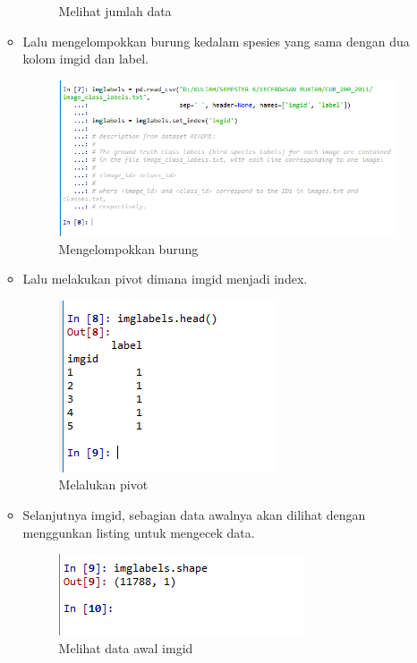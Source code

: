 \begin{enumerate}
\begin{itemize}
\begin{figure}[ht]
			\caption{Melihat jumlah data}
			\label{contoh}
			\end{figure}
		\item Lalu mengelompokkan burung kedalam spesies yang sama dengan dua kolom imgid dan label.
			\begin{figure}[ht]
			\centering
			\includegraphics[scale=0.5]{figures/AIP/ai13.PNG}
			\caption{Mengelompokkan burung}
			\label{contoh}
			\end{figure}
		\item Lalu melakukan pivot dimana imgid menjadi index.
			\begin{figure}[ht]
			\centering
			\includegraphics[scale=0.5]{figures/AIP/ai14.PNG}
			\caption{Melalukan pivot}
			\label{contoh}
			\end{figure}
		\item Selanjutnya imgid, sebagian data awalnya akan dilihat dengan menggunkan listing untuk mengecek data.
			\begin{figure}[ht]
			\centering
			\includegraphics[scale=0.5]{figures/AIP/ai15.PNG}
			\caption{Melihat data awal imgid}
			\label{contoh}
			\end{figure}

\end{itemize}
\end{enumerate}
